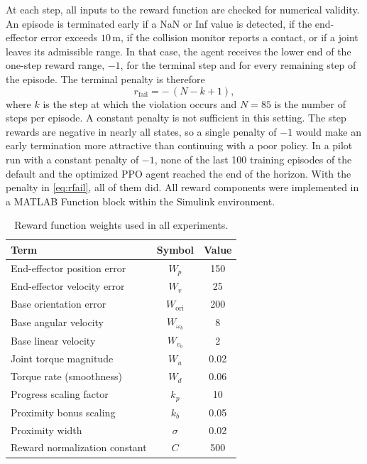 \documentclass{ieeeaccess}
\begin{document}
At each step, all inputs to the reward function are checked for numerical validity. An episode is
terminated early if a NaN or Inf value is detected, if the end-effector error exceeds $10\,\mathrm{m}$,
if the collision monitor reports a contact, or if a joint leaves its admissible range. In that case,
the agent receives the lower end of the one-step reward range, $-1$, for the terminal step and for
every remaining step of the episode. The terminal penalty is therefore
\begin{equation}
r_{\mathrm{fail}} = -\,(N - k + 1),
\label{eq:rfail}
\end{equation}
where $k$ is the step at which the violation occurs and $N = 85$ is the number of steps
per episode. A constant penalty is not sufficient in this setting. The step rewards are negative in
nearly all states, so a single penalty of $-1$ would make an early termination more attractive than
continuing with a poor policy. In a pilot run with a constant penalty of $-1$, none of the
last 100 training episodes of the default and the optimized PPO agent reached the end of the horizon.
With the penalty in \eqref{eq:rfail}, all of them did. All reward components were implemented in a MATLAB
Function block within the Simulink environment.

\begin{table}[!b]
\centering
\caption{Reward function weights used in all experiments.}
\label{tab:reward_weights}
\begin{tabular}{lcc}
\toprule
\textbf{Term} & \textbf{Symbol} & \textbf{Value} \\
\midrule
End-effector position error      & $W_p$              & 150   \\
End-effector velocity error      & $W_v$              & 25    \\
Base orientation error           & $W_{\mathrm{ori}}$   & 200   \\
Base angular velocity            & $W_{\omega_b}$     & 8     \\
Base linear velocity             & $W_{v_b}$          & 2     \\
Joint torque magnitude           & $W_u$              & 0.02  \\
Torque rate (smoothness)         & $W_d$              & 0.06  \\
Progress scaling factor          & $k_p$              & 10    \\
Proximity bonus scaling          & $k_b$              & 0.05  \\
Proximity width                  & $\sigma$           & 0.02  \\
Reward normalization constant    & $C$                & 500   \\
\bottomrule
\end{tabular}
\end{table}
\end{document}
